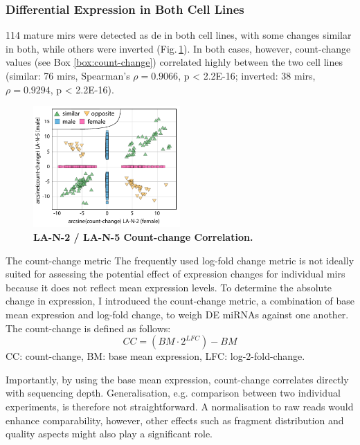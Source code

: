 \subsubsection{Differential Expression in Both Cell Lines}


114 mature \acp{mir} were detected as \ac{de} in both cell lines, with some changes similar in both, while others were inverted (Fig.\,\ref{fig:countchangecor}). In both cases, however, count-change values (see Box \ref{box:count-change}) correlated highly between the two cell lines (similar: 76 \acp{mir}, Spearman’s $\rho = 0.9066$, p < 2.2E-16; inverted: 38 \acp{mir}, $\rho = 0.9294$, p < 2.2E-16).

\begin{figure}
\centering
\includegraphics[width=0.5\textwidth]{figures/countchangecor}
\caption[LA-N-2 / LA-N-5 Count-change Correlation.]{\textbf{LA-N-2 / LA-N-5 Count-change Correlation.}
\label{fig:countchangecor}}
\end{figure}

\begin{mybox}{The count-change metric}\label{box:count-change}
The frequently used log-fold change metric is not ideally suited for assessing the potential effect of expression changes for individual \acp{mir} because it does not reflect mean expression levels. To determine the absolute change in expression, I introduced the count-change metric, a combination of base mean expression and log-fold change, to weigh DE miRNAs against one another. The count-change is defined as follows: $$CC = (BM \cdot 2^{LFC}) - BM$$
CC: count-change, BM: base mean expression, LFC: log-2-fold-change.

Importantly, by using the base mean expression, count-change correlates directly with sequencing depth. Generalisation, e.g. comparison between two individual experiments, is therefore not straightforward. A normalisation to raw reads would enhance comparability, however, other effects such as fragment distribution and quality aspects might also play a significant role.
\end{mybox}

